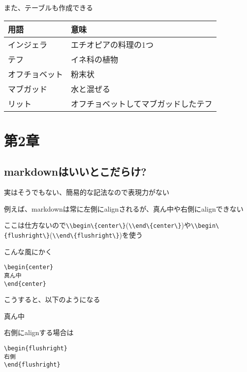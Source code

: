 \documentclass[
  12pt,
  a4j]{ltjarticle}
\newcommand{\passthrough}[1]{#1}
\begin{document}
また、テーブルも作成できる

\begin{longtable}[]{@{}ll@{}}
\toprule
用語 & 意味 \\
\midrule
\endhead
インジェラ & エチオピアの料理の1つ \\
テフ & イネ科の植物 \\
オフチョベット & 粉末状 \\
マブガッド & 水と混ぜる \\
リット & オフチョベットしてマブガッドしたテフ \\
\bottomrule
\end{longtable}

\hypertarget{ux7b2c2ux7ae0}{%
\section{第2章}\label{ux7b2c2ux7ae0}}

\hypertarget{markdownux306fux3044ux3044ux3068ux3053ux3060ux3089ux3051}{%
\subsection{markdownはいいとこだらけ?}\label{markdownux306fux3044ux3044ux3068ux3053ux3060ux3089ux3051}}

実はそうでもない、簡易的な記法なので表現力がない

例えば、markdownは常に左側にalignされるが、真ん中や右側にalignできない

ここは仕方ないので\passthrough{\lstinline!\\begin\{center\}!}(\passthrough{\lstinline!\\end\{center\}!})や\passthrough{\lstinline!\\begin\{flushright\}!}(\passthrough{\lstinline!\\end\{flushright\}!})を使う

こんな風にかく

\begin{lstlisting}[title=LaTeXの真ん中]
\begin{center}
真ん中
\end{center}
\end{lstlisting}

こうすると、以下のようになる

\begin{center}
真ん中
\end{center}

右側にalignする場合は

\begin{lstlisting}[title=LaTeXの右側]
\begin{flushright}
右側
\end{flushright}
\end{lstlisting}
\end{document}
